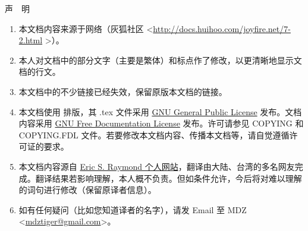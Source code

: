 \centerline{\LARGE 声\,\,\,\,\,\,明}

\baselineskip

\large
\begin{enumerate}
\item 本文档内容来源于网络（灰狐社区 <\url{http://docs.huihoo.com/joyfire.net/7-2.html} >）。
\item 本人对文档中的部分文字（主要是繁体）和标点作了修改，以更清晰地显示文档的行文。
\item 本文档中的不少链接已经失效，保留原版本文档的链接。
\item 本文档使用 \XeLaTeX{} 排版，其 .tex 文件采用 \href{http://www.gnu.org/copyleft/gpl.html}{GNU General Public License} 发布。文档内容采用 \href{http://www.gnu.org/copyleft/fdl.html}{GNU Free Documentation License} 发布。许可请参见 COPYING 和 COPYING.FDL 文件。若要修改本文档内容、传播本文档等，请自觉遵循许可证的要求。
\item 本文档内容源自 \href{http://www.catb.org/~esr/}{Eric S. Raymond 个人网站}，翻译由大陆、台湾的多名网友完成。翻译结果若影响理解，本人概不负责。但如条件允许，今后将对难以理解的词句进行修改（保留原译者信息）。
\item 如有任何疑问（比如您知道译者的名字），请发 Email 至 MDZ <\href{mailto:mdztiger@gmail.com}{mdztiger@gmail.com}>。
\end{enumerate}

\normalsize 
